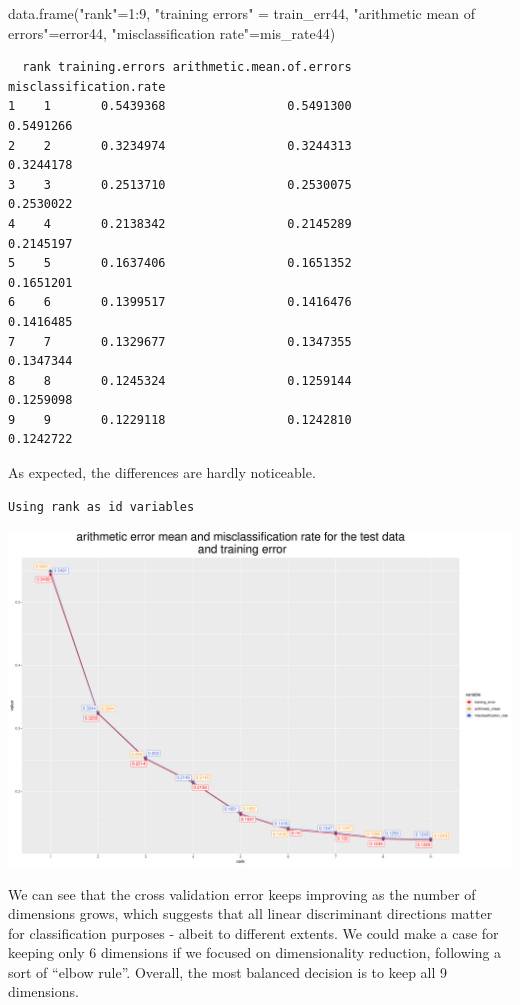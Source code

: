 \documentclass[
  letterpaper,
  DIV=11,
  numbers=noendperiod]{scrartcl}
\newenvironment{Shaded}{\begin{snugshade}}{\end{snugshade}}
\newcommand{\DecValTok}[1]{\textcolor[rgb]{0.68,0.00,0.00}{#1}}
\newcommand{\FunctionTok}[1]{\textcolor[rgb]{0.28,0.35,0.67}{#1}}
\newcommand{\NormalTok}[1]{\textcolor[rgb]{0.00,0.23,0.31}{#1}}
\newcommand{\OtherTok}[1]{\textcolor[rgb]{0.00,0.23,0.31}{#1}}
\newcommand{\SpecialCharTok}[1]{\textcolor[rgb]{0.37,0.37,0.37}{#1}}
\newcommand{\StringTok}[1]{\textcolor[rgb]{0.13,0.47,0.30}{#1}}
\begin{document}
\begin{Shaded}
\begin{Highlighting}[]
\FunctionTok{data.frame}\NormalTok{(}\StringTok{"rank"}\OtherTok{=}\DecValTok{1}\SpecialCharTok{:}\DecValTok{9}\NormalTok{, }\StringTok{"training errors"} \OtherTok{=}\NormalTok{ train\_err44, }
       \StringTok{"arithmetic mean of errors"}\OtherTok{=}\NormalTok{error44,}
\StringTok{"misclassification rate"}\OtherTok{=}\NormalTok{mis\_rate44)}
\end{Highlighting}
\end{Shaded}

\begin{verbatim}
  rank training.errors arithmetic.mean.of.errors misclassification.rate
1    1       0.5439368                 0.5491300              0.5491266
2    2       0.3234974                 0.3244313              0.3244178
3    3       0.2513710                 0.2530075              0.2530022
4    4       0.2138342                 0.2145289              0.2145197
5    5       0.1637406                 0.1651352              0.1651201
6    6       0.1399517                 0.1416476              0.1416485
7    7       0.1329677                 0.1347355              0.1347344
8    8       0.1245324                 0.1259144              0.1259098
9    9       0.1229118                 0.1242810              0.1242722
\end{verbatim}

As expected, the differences are hardly noticeable.

\begin{verbatim}
Using rank as id variables
\end{verbatim}

\includegraphics{ProblemSet2_files/figure-pdf/unnamed-chunk-77-1.pdf}

We can see that the cross validation error keeps improving as the number
of dimensions grows, which suggests that all linear discriminant
directions matter for classification purposes - albeit to different
extents. We could make a case for keeping only 6 dimensions if we
focused on dimensionality reduction, following a sort of ``elbow rule''.
Overall, the most balanced decision is to keep all 9 dimensions.
\end{document}
